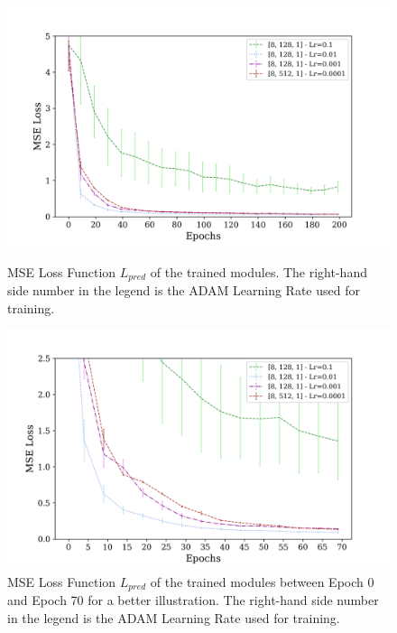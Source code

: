         \begin{figure}[hbtp]
                \centering
                \includegraphics[width=15cm, keepaspectratio]{images/results/module_lr_2.png}
                \caption{MSE Loss Function $L_{pred}$ of the trained modules. The right-hand side number in the legend is the ADAM Learning Rate used for training.}
                \label{fig:results_lr_2}
                
                \vspace{1.5cm}
                
                \includegraphics[width=15cm, keepaspectratio]{images/results/module_lr_1.png}
                \caption{MSE Loss Function $L_{pred}$ of the trained modules between Epoch 0 and Epoch 70 for a better illustration. The right-hand side number in the legend is the ADAM Learning Rate used for training.}
                \label{fig:results_lr_1}
        \end{figure}
        
